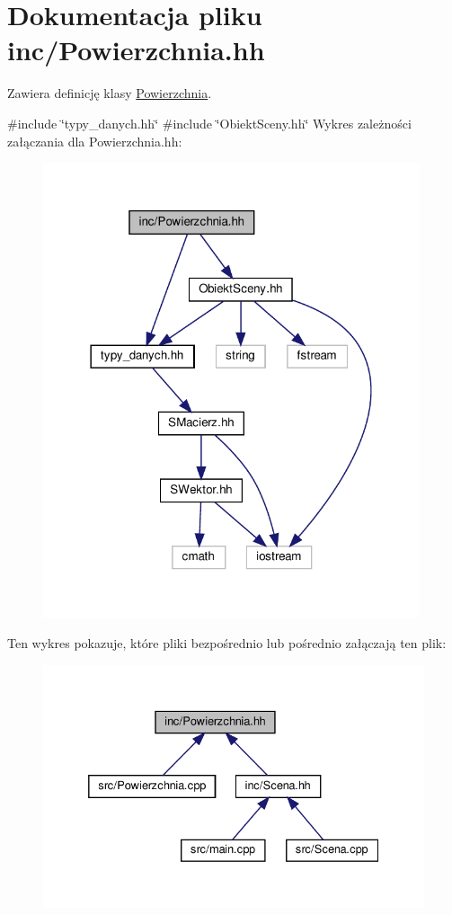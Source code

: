 \hypertarget{Powierzchnia_8hh}{}\section{Dokumentacja pliku inc/\+Powierzchnia.hh}
\label{Powierzchnia_8hh}


Zawiera definicję klasy \hyperlink{classPowierzchnia}{Powierzchnia}.  


{\ttfamily \#include \char`\"{}typy\+\_\+danych.\+hh\char`\"{}}\newline
{\ttfamily \#include \char`\"{}Obiekt\+Sceny.\+hh\char`\"{}}\newline
Wykres zależności załączania dla Powierzchnia.\+hh\+:\nopagebreak
\begin{figure}[H]
\begin{center}
\leavevmode
\includegraphics[width=314pt]{Powierzchnia_8hh__incl}
\end{center}
\end{figure}
Ten wykres pokazuje, które pliki bezpośrednio lub pośrednio załączają ten plik\+:\nopagebreak
\begin{figure}[H]
\begin{center}
\leavevmode
\includegraphics[width=332pt]{Powierzchnia_8hh__dep__incl}
\end{center}
\end{figure}
